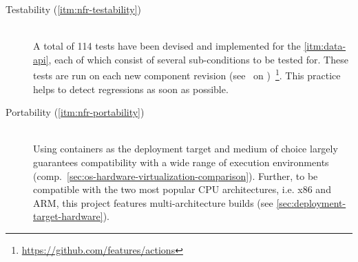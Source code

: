 \begin{description}
  \item[Testability (\ref{itm:nfr-testability})]
  \hfill \\
  A total of 114 tests have been devised and implemented for the \ref{itm:data-api}, each of which consist of several sub-conditions to be tested for. These tests are run on each new component revision (see~ on )~\footnote{\url{https://github.com/features/actions}}. This practice helps to detect regressions as soon as possible.

  \item[Portability (\ref{itm:nfr-portability})]
  \hfill \\
  Using containers as the deployment target and medium of choice largely guarantees compatibility with a wide range of execution environments (comp.~\autoref{sec:os-hardware-virtualization-comparison}). Further, to be compatible with the two most popular \acs{CPU} architectures, i.e. x86 and \acs{ARM}, this project features multi-architecture builds (see \autoref{sec:deployment-target-hardware}).
\end{description}
